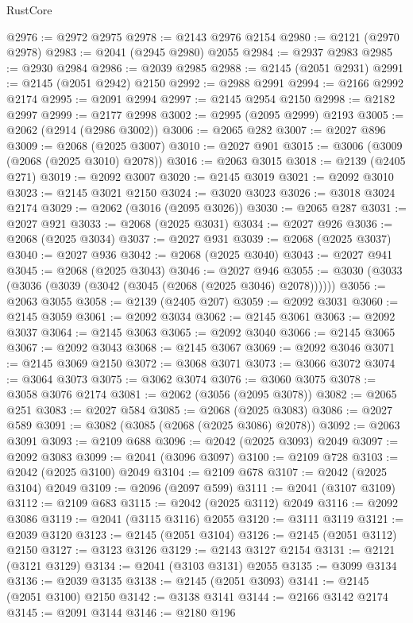 \begin{lexlean}{RustCore}
\begin{coremodule}
@2976 := @2972 @2975
@2978 := @2143 @2976 @2154
@2980 := @2121 (@2970 @2978)
@2983 := @2041 (@2945 @2980) @2055
@2984 := @2937 @2983
@2985 := @2930 @2984
@2986 := @2039 @2985
@2988 := @2145 (@2051 @2931)
@2991 := @2145 (@2051 @2942) @2150
@2992 := @2988 @2991
@2994 := @2166 @2992 @2174
@2995 := @2091 @2994
@2997 := @2145 @2954 @2150
@2998 := @2182 @2997
@2999 := @2177 @2998
@3002 := @2995 (@2095 @2999) @2193
@3005 := @2062 (@2914 (@2986 @3002))
@3006 := @2065 @282
@3007 := @2027 @896
@3009 := @2068 (@2025 @3007)
@3010 := @2027 @901
@3015 := @3006 (@3009 (@2068 (@2025 @3010) @2078))
@3016 := @2063 @3015
@3018 := @2139 (@2405 @271)
@3019 := @2092 @3007
@3020 := @2145 @3019
@3021 := @2092 @3010
@3023 := @2145 @3021 @2150
@3024 := @3020 @3023
@3026 := @3018 @3024 @2174
@3029 := @2062 (@3016 (@2095 @3026))
@3030 := @2065 @287
@3031 := @2027 @921
@3033 := @2068 (@2025 @3031)
@3034 := @2027 @926
@3036 := @2068 (@2025 @3034)
@3037 := @2027 @931
@3039 := @2068 (@2025 @3037)
@3040 := @2027 @936
@3042 := @2068 (@2025 @3040)
@3043 := @2027 @941
@3045 := @2068 (@2025 @3043)
@3046 := @2027 @946
@3055 := @3030 (@3033 (@3036 (@3039 (@3042 (@3045 (@2068 (@2025 @3046) @2078))))))
@3056 := @2063 @3055
@3058 := @2139 (@2405 @207)
@3059 := @2092 @3031
@3060 := @2145 @3059
@3061 := @2092 @3034
@3062 := @2145 @3061
@3063 := @2092 @3037
@3064 := @2145 @3063
@3065 := @2092 @3040
@3066 := @2145 @3065
@3067 := @2092 @3043
@3068 := @2145 @3067
@3069 := @2092 @3046
@3071 := @2145 @3069 @2150
@3072 := @3068 @3071
@3073 := @3066 @3072
@3074 := @3064 @3073
@3075 := @3062 @3074
@3076 := @3060 @3075
@3078 := @3058 @3076 @2174
@3081 := @2062 (@3056 (@2095 @3078))
@3082 := @2065 @251
@3083 := @2027 @584
@3085 := @2068 (@2025 @3083)
@3086 := @2027 @589
@3091 := @3082 (@3085 (@2068 (@2025 @3086) @2078))
@3092 := @2063 @3091
@3093 := @2109 @688
@3096 := @2042 (@2025 @3093) @2049
@3097 := @2092 @3083
@3099 := @2041 (@3096 @3097)
@3100 := @2109 @728
@3103 := @2042 (@2025 @3100) @2049
@3104 := @2109 @678
@3107 := @2042 (@2025 @3104) @2049
@3109 := @2096 (@2097 @599)
@3111 := @2041 (@3107 @3109)
@3112 := @2109 @683
@3115 := @2042 (@2025 @3112) @2049
@3116 := @2092 @3086
@3119 := @2041 (@3115 @3116) @2055
@3120 := @3111 @3119
@3121 := @2039 @3120
@3123 := @2145 (@2051 @3104)
@3126 := @2145 (@2051 @3112) @2150
@3127 := @3123 @3126
@3129 := @2143 @3127 @2154
@3131 := @2121 (@3121 @3129)
@3134 := @2041 (@3103 @3131) @2055
@3135 := @3099 @3134
@3136 := @2039 @3135
@3138 := @2145 (@2051 @3093)
@3141 := @2145 (@2051 @3100) @2150
@3142 := @3138 @3141
@3144 := @2166 @3142 @2174
@3145 := @2091 @3144
@3146 := @2180 @196

\end{coremodule}
\end{lexlean}
